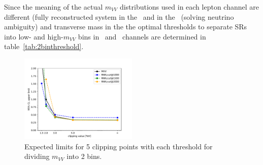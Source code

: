 Since the meaning of the actual $m_{VV}$ distributions used in each lepton channel are different
(fully reconstructed system in the \tlep\ and in the \olep\ (solving neutrino ambiguity) and transverse mass in the \zlep\)
the optimal thresholds to separate SRs into low- and high-$m_{VV}$ bins in \olep\ and \zlep\ channels are determined in table~\ref{tab:2binthreshold}.

\begin{figure}[h]
        \centering
    	\includegraphics[width=0.50\textwidth]{figures/aQGC/ClippedFT02bin.pdf}
        \caption{Expected limits for 5 clipping points with each threshold for dividing $m_{VV}$ into 2 bins.}
        \label{fig:ThresholdScan}
\end{figure}



